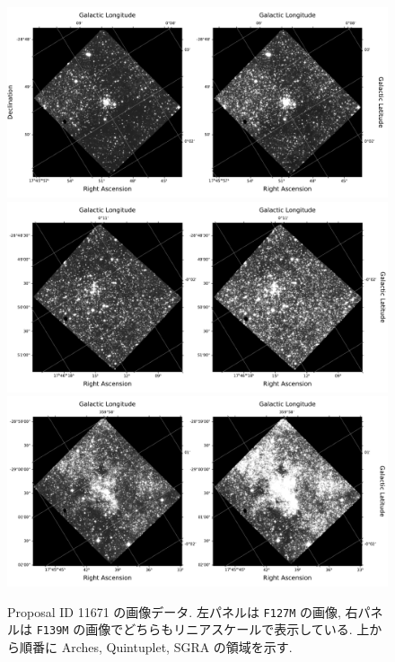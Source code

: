 \documentclass[10pt,a4paper,dvipdfmx,uplatex]{jsarticle}
\begin{document}
\begin{figure}
  \centering
  \includegraphics[width=\linewidth]{img/hst_11671_04_wfc3_ir_f127m_drz.pdf}
  \includegraphics[width=\linewidth]{img/hst_11671_05_wfc3_ir_f127m_drz.pdf}
  \includegraphics[width=\linewidth]{img/hst_11671_06_wfc3_ir_f127m_drz.pdf}
  \caption{Proposal ID 11671 の画像データ. 左パネルは \texttt{F127M} の画像, 右パネルは \texttt{F139M} の画像でどちらもリニアスケールで表示している. 上から順番に Arches, Quintuplet, SGRA の領域を示す.}
  \label{fig:11671}
\end{figure}
\end{document}
